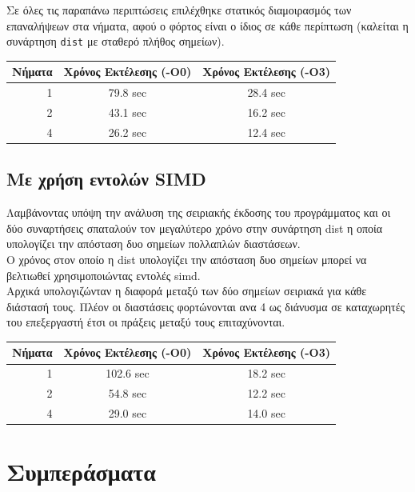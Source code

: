 \documentclass{article}
\begin{document}
Σε όλες τις παραπάνω περιπτώσεις επιλέχθηκε στατικός διαμοιρασμός των επαναλήψεων στα νήματα, αφού ο φόρτος είναι ο ίδιος σε κάθε περίπτωση (καλείται η συνάρτηση \texttt{dist} με σταθερό πλήθος σημείων).

\begin{center}
\begin{tabular}{|r|c|c|}
    \hline
    Νήματα & Χρόνος Εκτέλεσης (-Ο0) & Χρόνος Εκτέλεσης (-Ο3) \\ \hline
    1 & 79.8 sec & 28.4 sec \\
    2 & 43.1 sec & 16.2 sec \\
    4 & 26.2 sec & 12.4 sec \\ \hline
\end{tabular}
\end{center}

\subsection{Με χρήση εντολών SIMD}
Λαμβάνοντας υπόψη την ανάλυση της σειριακής έκδοσης του προγράμματος και οι δύο συναρτήσεις σπαταλούν τον μεγαλύτερο χρόνο στην συνάρτηση dist η οποία υπολογίζει την απόσταση δυο σημείων πολλαπλών διαστάσεων.\\
Ο χρόνος στον οποίο η dist υπολογίζει την απόσταση δυο σημείων μπορεί να βελτιωθεί χρησιμοποιώντας εντολές simd.\\
Αρχικά υπολογιζώνταν η διαφορά μεταξύ των δύο σημείων σειριακά για κάθε διάστασή τους. Πλέον οι διαστάσεις φορτώνονται ανα 4 ως διάνυσμα σε καταχωρητές του επεξεργαστή έτσι οι πράξεις μεταξύ τους επιταχύνονται.

\begin{center}
\begin{tabular}{|r|c|c|}
    \hline
    Νήματα & Χρόνος Εκτέλεσης (-O0) & Χρόνος Εκτέλεσης (-Ο3) \\ \hline
    1 & 102.6 sec & 18.2 sec \\
    2 & 54.8 sec & 12.2 sec \\
    4 & 29.0 sec & 14.0 sec \\ \hline
\end{tabular}
\end{center}

\section{Συμπεράσματα}
\end{document}
